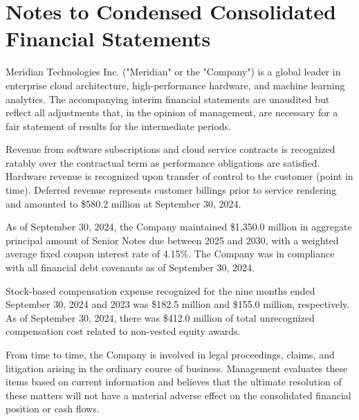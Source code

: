 \documentclass[10pt,a4paper]{article}
\begin{document}
\section{Notes to Condensed Consolidated Financial Statements}

\begin{description}[font=\color{BrandBlue}\bfseries, leftmargin=0.5em, itemsep=2pt, parsep=0pt]
  \item[Note 1 -- Organization and Summary of Significant Accounting Policies]
    Meridian Technologies Inc. ("Meridian" or the "Company") is a global leader in enterprise cloud architecture, high-performance hardware, and machine learning analytics. The accompanying interim financial statements are unaudited but reflect all adjustments that, in the opinion of management, are necessary for a fair statement of results for the intermediate periods.

  \item[Note 2 -- Revenue Recognition (ASC 606)]
    Revenue from software subscriptions and cloud service contracts is recognized ratably over the contractual term as performance obligations are satisfied. Hardware revenue is recognized upon transfer of control to the customer (point in time). Deferred revenue represents customer billings prior to service rendering and amounted to \$580.2 million at September 30, 2024.

  \item[Note 3 -- Financing Arrangements \& Debt Obligations]
    As of September 30, 2024, the Company maintained \$1,350.0 million in aggregate principal amount of Senior Notes due between 2025 and 2030, with a weighted average fixed coupon interest rate of 4.15\%. The Company was in compliance with all financial debt covenants as of September 30, 2024.

  \item[Note 4 -- Stock-Based Compensation \& Capital Structure]
    Stock-based compensation expense recognized for the nine months ended September 30, 2024 and 2023 was \$182.5 million and \$155.0 million, respectively. As of September 30, 2024, there was \$412.0 million of total unrecognized compensation cost related to non-vested equity awards.

  \item[Note 5 -- Commitments and Contingencies]
    From time to time, the Company is involved in legal proceedings, claims, and litigation arising in the ordinary course of business. Management evaluates these items based on current information and believes that the ultimate resolution of these matters will not have a material adverse effect on the consolidated financial position or cash flows.
\end{description}
\end{document}
